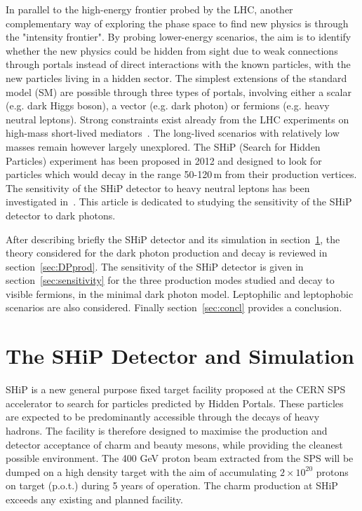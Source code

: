 \documentclass[12pt,a4paper]{article}
\begin{document}

In parallel to the high-energy frontier probed by the LHC, another
complementary way of exploring the phase space to find new physics is
through the "intensity frontier". By probing lower-energy scenarios,
the aim is to identify whether the new physics could be hidden from
sight due to weak connections through portals instead of direct
interactions with the known particles, with the new particles living
in a hidden sector. The simplest extensions of the standard model (SM)
are possible through three types of portals, involving either a scalar
(e.g. dark Higgs boson), a vector (e.g. dark photon) or fermions
(e.g. heavy neutral leptons). Strong constraints exist already from
the LHC experiments on high-mass short-lived
mediators~\cite{Aaboud:2018fvk,Aaboud:2017buh,CMS-PAS-HIG-18-003,Khachatryan:2016zqb}. The
long-lived scenarios with relatively low masses remain however largely
unexplored. The SHiP (Search for Hidden Particles) experiment\cite{TP}
has been proposed in 2012 and designed to look for particles which
would decay in the range 50-120\,m from their production vertices. The
sensitivity of the SHiP detector to heavy neutral leptons has been
investigated in~\cite{SHiPPaper3}. This article is dedicated to
studying the sensitivity of the SHiP detector to dark photons.

After describing briefly the SHiP detector and its simulation in
section~\ref{sec:shipdetector}, the theory considered for the dark
photon production and decay is reviewed in
section~\ref{sec:DPprod}. The sensitivity of the SHiP detector is
given in section~\ref{sec:sensitivity} for the three production modes
studied and decay to visible fermions, in the minimal dark photon
model. Leptophilic and leptophobic scenarios are also
considered. Finally section~\ref{sec:concl} provides a conclusion.

\section{The SHiP Detector and Simulation}
\label{sec:shipdetector}

SHiP\cite{TP} is a new general purpose fixed target facility proposed
at the CERN SPS accelerator to search for particles predicted by
Hidden Portals.  These particles are expected to be predominantly
accessible through the decays of heavy hadrons. The facility is
therefore designed to maximise the production and detector acceptance
of charm and beauty mesons, while providing the cleanest possible
environment.  The 400 GeV proton beam extracted from the SPS will be
dumped on a high density target with the aim of accumulating $2\times
10^{20}$ protons on target (p.o.t.) during 5 years of operation.  The charm
production at SHiP exceeds any existing and planned facility.
\end{document}

